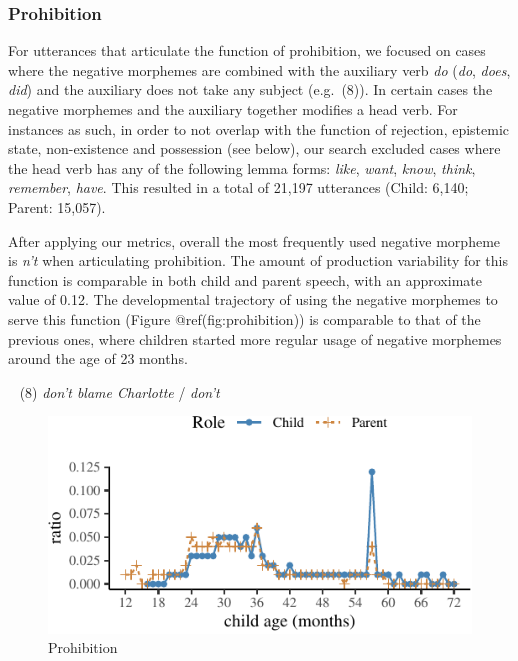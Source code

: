 \documentclass[10pt, letterpaper]{article}
\newenvironment{CodeChunk}{}{}
\begin{document}
\hypertarget{prohibition}{%
\subsubsection{Prohibition}\label{prohibition}}

For utterances that articulate the function of prohibition, we focused
on cases where the negative morphemes are combined with the auxiliary
verb \emph{do} (\emph{do}, \emph{does}, \emph{did}) and the auxiliary
does not take any subject (e.g.~(8)). In certain cases the negative
morphemes and the auxiliary together modifies a head verb. For instances
as such, in order to not overlap with the function of rejection,
epistemic state, non-existence and possession (see below), our search
excluded cases where the head verb has any of the following lemma forms:
\emph{like}, \emph{want}, \emph{know}, \emph{think}, \emph{remember},
\emph{have}. This resulted in a total of 21,197 utterances (Child:
6,140; Parent: 15,057).

After applying our metrics, overall the most frequently used negative
morpheme is \emph{n't} when articulating prohibition. The amount of
production variability for this function is comparable in both child and
parent speech, with an approximate value of 0.12. The developmental
trajectory of using the negative morphemes to serve this function
(Figure @ref(fig:prohibition)) is comparable to that of the previous
ones, where children started more regular usage of negative morphemes
around the age of 23 months.

~ (8) \emph{don't blame Charlotte} / \emph{don't}

\begin{CodeChunk}
\begin{figure}[H]

{\centering \includegraphics{figs/prohibition-1} 

}

\caption[Prohibition]{Prohibition}\label{fig:prohibition}
\end{figure}
\end{CodeChunk}
\end{document}
